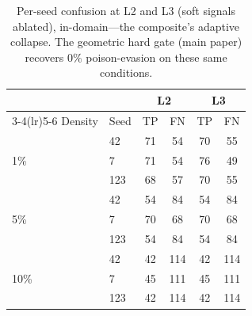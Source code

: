 \documentclass[10pt,journal,compsoc]{IEEEtran}
\begin{document}
\begin{table}[H]
\centering
\caption{Per-seed confusion at L2 and L3 (soft signals ablated), in-domain---the
composite's adaptive collapse. The geometric hard gate (main paper)
recovers $0\%$ poison-evasion on these same conditions.}
\label{tab:confL23}
\begin{tabular}{llcccc}
\toprule
 & & \multicolumn{2}{c}{L2} & \multicolumn{2}{c}{L3} \\
\cmidrule(lr){3-4}\cmidrule(lr){5-6}
Density & Seed & TP & FN & TP & FN \\
\midrule
\multirow{3}{*}{1\%}  & 42  & 71 & 54  & 70 & 55  \\
                      & 7   & 71 & 54  & 76 & 49  \\
                      & 123 & 68 & 57  & 70 & 55  \\
\midrule
\multirow{3}{*}{5\%}  & 42  & 54 & 84  & 54 & 84  \\
                      & 7   & 70 & 68  & 70 & 68  \\
                      & 123 & 54 & 84  & 54 & 84  \\
\midrule
\multirow{3}{*}{10\%} & 42  & 42 & 114 & 42 & 114 \\
                      & 7   & 45 & 111 & 45 & 111 \\
                      & 123 & 42 & 114 & 42 & 114 \\
\bottomrule
\end{tabular}
\end{table}
\end{document}
